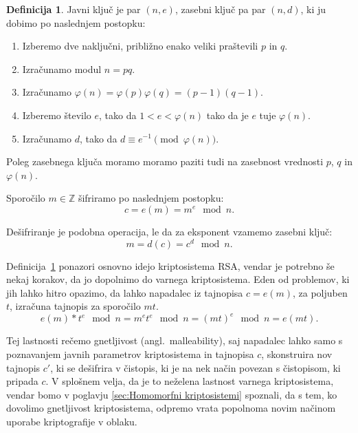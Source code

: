 \documentclass[12pt,a4paper,openany,tikz]{book}
\theoremstyle{plain}
\theoremstyle{definition}
\newtheorem{defn}[thm]{Definicija} %
\begin{document}
\begin{mdframed}[frametitle={RSA kriptosistem}]
\begin{minipage}{\textwidth}
  \begin{defn}
    Javni ključ je par $(n, e)$, zasebni ključ pa par $(n, d)$, ki ju dobimo po naslednjem postopku:

    \begin{enumerate}
    \item Izberemo dve naključni, približno enako veliki praštevili $p$ in $q$.
    \item Izračunamo modul $n=pq$.
    \item Izračunamo $\varphi(n)=\varphi(p)\varphi(q)=(p-1)(q-1)$.
    \item Izberemo število $e$, tako da $1<e<\varphi(n)$ tako da je $e$ tuje $\varphi(n)$.
    \item Izračunamo $d$, tako da $d \equiv e^{-1} \pmod{\varphi(n)}$.
    \end{enumerate}

    Poleg zasebnega ključa moramo moramo paziti tudi na zasebnost vrednosti $p$, $q$ in $\varphi(n)$.

    Sporočilo $m \in \mathbb{Z}$ šifriramo po naslednjem postopku: $$c=e(m)=m^e \mod n.$$

    Dešifriranje je podobna operacija, le da za eksponent vzamemo zasebni ključ: $$m=d(c)=c^d \mod n.$$
    \label{def:rsa}
  \end{defn}
\end{minipage}
\end{mdframed}

Definicija~\ref{def:rsa} ponazori osnovno idejo kriptosistema RSA, vendar je potrebno še nekaj korakov, da jo dopolnimo do varnega kriptosistema. Eden od problemov, ki jih lahko hitro opazimo, da lahko napadalec iz tajnopisa $c = e(m)$, za poljuben $t$, izračuna tajnopis za sporočilo $mt$.
$$
e(m)*t^e \mod n = m^et^e \mod n = (mt)^e \mod n = e(mt).
$$

Tej lastnosti rečemo gnetljivost (angl.\ malleability), saj napadalec lahko samo s poznavanjem javnih parametrov kriptosistema in tajnopisa $c$, skonstruira nov tajnopis $c'$, ki se dešifrira v čistopis, ki je na nek način povezan s čistopisom, ki pripada $c$. V splošnem velja, da je to neželena lastnost varnega kriptosistema, vendar bomo v poglavju \ref{sec:Homomorfni kriptosistemi} spoznali, da s tem, ko dovolimo gnetljivost kriptosistema, odpremo vrata popolnoma novim načinom uporabe kriptografije v oblaku.
\end{document}
